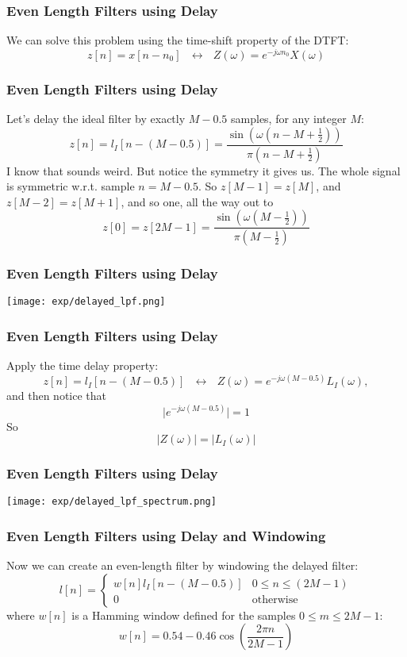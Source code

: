 \documentclass{beamer}
\begin{document}
\begin{frame}
  \frametitle{Even Length Filters using Delay}

  We can solve this problem using the time-shift property of the DTFT:
  \[
  z[n] = x[n-n_0]~~~\leftrightarrow~~~
  Z(\omega)=e^{-j\omega n_0}X(\omega)
  \]
\end{frame}
  
\begin{frame}
  \frametitle{Even Length Filters using Delay}

  Let's delay the ideal filter by exactly $M-0.5$ samples, for any
  integer $M$:
  \[
  z[n] = l_I\left[n-(M-0.5)\right] =
  \frac{\sin\left(\omega \left(n-M+\frac{1}{2}\right)\right)}{\pi \left(n-M+\frac{1}{2}\right)}
  \]
  I know that sounds weird.  But notice the symmetry it gives us.  The whole signal is symmetric
  w.r.t. sample $n=M-0.5$.  So $z[M-1]=z[M]$, and $z[M-2]=z[M+1]$, and so one, all the way out to
  \begin{displaymath}
    z[0] = z[2M-1] =
    \frac{\sin\left(\omega \left(M-\frac{1}{2}\right)\right)}{\pi \left(M-\frac{1}{2}\right)}
  \end{displaymath}
\end{frame}

\begin{frame}
  \frametitle{Even Length Filters using Delay}
  
  \centerline{\texttt{[image: exp/delayed\_lpf.png]}}
\end{frame}
  
\begin{frame}
  \frametitle{Even Length Filters using Delay}

  Apply the time delay property:
  \[
  z[n] = l_I\left[n-(M-0.5)\right]
  ~~~\leftrightarrow~~~
  Z(\omega)=e^{-j\omega (M-0.5)}L_I(\omega),
  \]
  and then notice that
  \[
  \vert e^{-j\omega (M-0.5)}\vert = 1
  \]
  So
  \[
  \vert Z(\omega)\vert =\vert L_I(\omega)\vert
  \]
\end{frame}

\begin{frame}
  \frametitle{Even Length Filters using Delay}
  
  \centerline{\texttt{[image: exp/delayed\_lpf\_spectrum.png]}}
\end{frame}

\begin{frame}
  \frametitle{Even Length Filters using Delay and Windowing}

  Now we can create an even-length filter by windowing the delayed filter:
  \[
  l[n] = \begin{cases}
    w[n]l_I\left[n-(M-0.5)\right] & 0\le n\le (2M-1)\\
    0 &\mbox{otherwise}
  \end{cases}
  \]
  where $w[n]$ is a Hamming window defined for the samples $0\le m\le 2M-1$:
  \[
  w[n] = 0.54 - 0.46 \cos\left(\frac{2\pi n}{2M-1}\right)
  \]
\end{frame}
\end{document}
